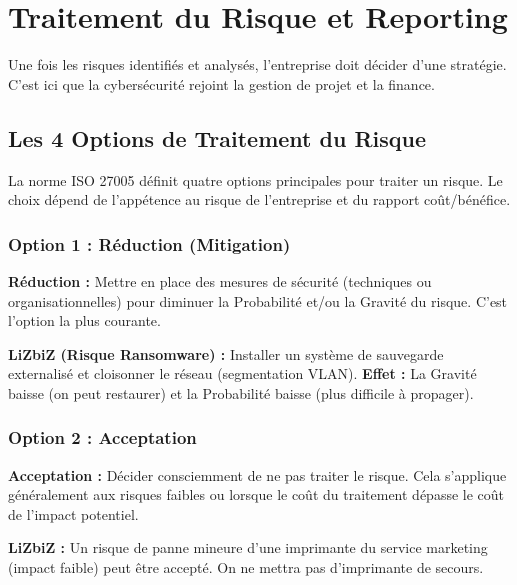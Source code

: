 \chapter{Traitement du Risque et Reporting}
\label{chap:traitement}

Une fois les risques identifiés et analysés, l'entreprise doit décider d'une stratégie. C'est ici que la cybersécurité rejoint la gestion de projet et la finance.

\section{Les 4 Options de Traitement du Risque}

La norme ISO 27005 définit quatre options principales pour traiter un risque. Le choix dépend de l'appétence au risque de l'entreprise et du rapport coût/bénéfice.

\subsection{Option 1 : Réduction (Mitigation)}

\begin{boxdef}
\textbf{Réduction :} Mettre en place des mesures de sécurité (techniques ou organisationnelles) pour diminuer la Probabilité et/ou la Gravité du risque. C'est l'option la plus courante.
\end{boxdef}

\begin{boxlizbiz}
\textbf{LiZbiZ (Risque Ransomware) :}
Installer un système de sauvegarde externalisé et cloisonner le réseau (segmentation VLAN).
\textbf{Effet :} La Gravité baisse (on peut restaurer) et la Probabilité baisse (plus difficile à propager).
\end{boxlizbiz}

\subsection{Option 2 : Acceptation}

\begin{boxdef}
\textbf{Acceptation :} Décider consciemment de ne pas traiter le risque. Cela s'applique généralement aux risques faibles ou lorsque le coût du traitement dépasse le coût de l'impact potentiel.
\end{boxdef}

\begin{boxlizbiz}
\textbf{LiZbiZ :} Un risque de panne mineure d'une imprimante du service marketing (impact faible) peut être accepté. On ne mettra pas d'imprimante de secours.
\end{boxlizbiz}

